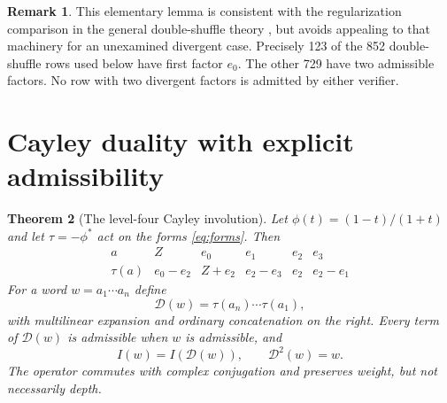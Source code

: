 \documentclass[11pt,letterpaper]{article}
\numberwithin{equation}{section}
\newtheorem{theorem}{Theorem}[section]
\theoremstyle{definition}
\newtheorem{remark}[theorem]{Remark}
\newcommand{\cay}{\mathcal D}
\begin{document}
\begin{remark}
This elementary lemma is consistent with the regularization comparison
in the general double-shuffle theory \cite{Zhao2010}, but avoids appealing
to that machinery for an unexamined divergent case. Precisely 123 of the
852 double-shuffle rows used below have first factor $e_0$. The other
729 have two admissible factors. No row with two divergent factors is
admitted by either verifier.
\end{remark}

\section{Cayley duality with explicit admissibility}
\label{sec:cayley}

\begin{theorem}[The level-four Cayley involution]\label{thm:cayley}
Let $\phi(t)=(1-t)/(1+t)$ and let $\tau=-\phi^*$ act on the forms
\eqref{eq:forms}. Then
\begin{equation}
\begin{array}{c|ccccc}
 a&Z&e_0&e_1&e_2&e_3\\ \hline
 \tau(a)&e_0-e_2&Z+e_2&e_2-e_3&e_2&e_2-e_1
\end{array}
\label{eq:tau}
\end{equation}
For a word $w=a_1\cdots a_n$ define
\begin{equation}
 \cay(w)=\tau(a_n)\cdots\tau(a_1),
 \label{eq:D}
\end{equation}
with multilinear expansion and ordinary concatenation on the right.
Every term of $\cay(w)$ is admissible when $w$ is admissible, and
\begin{equation}
 I(w)=I(\cay(w)),\qquad \cay^2(w)=w.
 \label{eq:duality}
\end{equation}
The operator commutes with complex conjugation and preserves weight,
but not necessarily depth.
\end{theorem}
\end{document}

